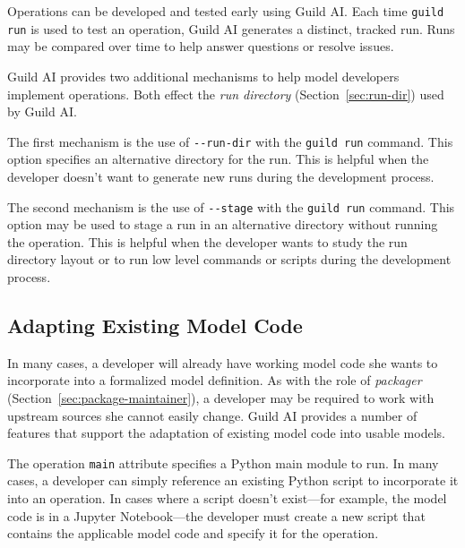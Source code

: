 \documentclass{article}
\begin{document}
Operations can be developed and tested early using Guild AI. Each time
\verb|guild run| is used to test an operation, Guild AI generates a
distinct, tracked run. Runs may be compared over time to help answer
questions or resolve issues.

Guild AI provides two additional mechanisms to help model developers
implement operations. Both effect the \emph{run directory}
(Section~\ref{sec:run-dir}) used by Guild AI.

The first mechanism is the use of \verb|--run-dir| with the
\verb|guild run| command. This option specifies an alternative
directory for the run. This is helpful when the developer doesn't want
to generate new runs during the development process.

The second mechanism is the use of \verb|--stage| with the
\verb|guild run| command. This option may be used to stage a run in an
alternative directory without running the operation. This is helpful
when the developer wants to study the run directory layout or to run
low level commands or scripts during the development process.

\iffalse
The developer can continue to evolve the model operations as needed to
satisfy user requirements. This may include new operations or
additional operation flags, which give users more flexibility when
running an operation. The developer may similarly add new models to
the Guild file.
\fi

\subsection{Adapting Existing Model Code}

In many cases, a developer will already have working model code she
wants to incorporate into a formalized model definition. As with the
role of \emph{packager} (Section~\ref{sec:package-maintainer}), a
developer may be required to work with upstream sources she cannot
easily change. Guild AI provides a number of features that support the
adaptation of existing model code into usable models.

The operation \verb|main| attribute specifies a Python main module to
run. In many cases, a developer can simply reference an existing
Python script to incorporate it into an operation. In cases where a
script doesn't exist---for example, the model code is in a Jupyter
Notebook---the developer must create a new script that contains the
applicable model code and specify it for the operation.
\end{document}
